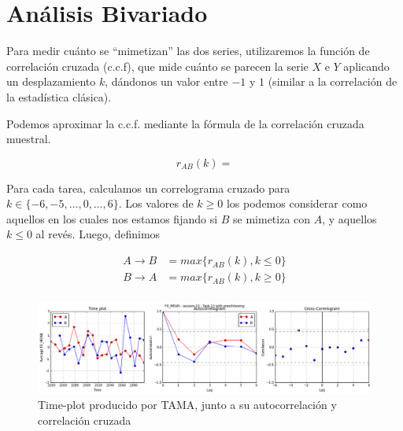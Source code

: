\section{Análisis Bivariado}

Para medir cuánto se ``mimetizan'' las dos series, utilizaremos la función de correlación cruzada (c.c.f), que mide cuánto se parecen la serie $X$ e $Y$ aplicando un desplazamiento $k$, dándonos un valor entre $-1$ y $1$ (similar a la correlación de la estadística clásica).

Podemos aproximar la c.c.f. mediante la fórmula de la correlación cruzada muestral.

\begin{equation}
  r_{AB}(k) =
\end{equation}

Para cada tarea, calculamos un correlograma cruzado para $k \in \{-6, -5, \ldots, 0, \ldots , 6\}$. Los valores de $k \geq 0$ los podemos considerar como aquellos en los cuales nos estamos fijando si $B$ se mimetiza con $A$, y aquellos $k \leq 0$ al revés. Luego, definimos

\begin{align}
  A \rightarrow B &= max \{ r_{AB}(k), k \leq 0 \} \\
  B \rightarrow A &= max \{ r_{AB}(k), k \geq 0 \} \\
\end{align}




\begin{figure}
\centering
\includegraphics[width=15cm]{images/time_plot_with_cross_correlation.png}
\caption{Time-plot producido por TAMA, junto a su autocorrelación y correlación cruzada\label{time_plot_with_bivariate}}

\end{figure}
